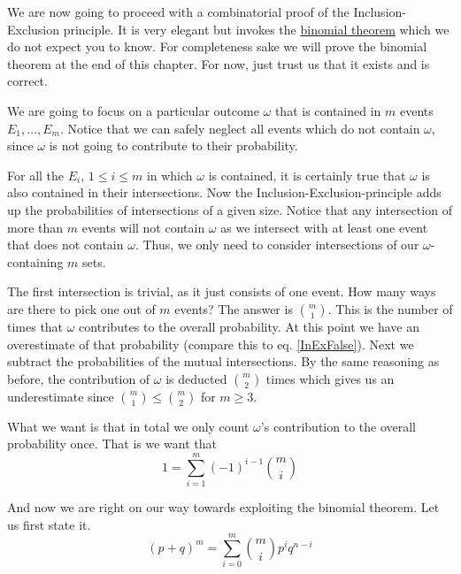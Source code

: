 \documentclass[a4paper,11pt,leqno]{report}
\begin{document}
We are now going to proceed with a combinatorial proof of the Inclusion-Exclusion principle. It is
very elegant but invokes the \href{https://en.wikipedia.org/wiki/Binomial_theorem}{binomial theorem}
which we do not expect you to know. For completeness sake we will prove the binomial theorem
at the end of this chapter. For now, just trust us that it exists and is correct.

We are going to focus on a particular outcome $ \omega $ that is contained in $ m $ events 
$ E_{1}, \ldots, E_{m} $. Notice that we can safely neglect all events which do not contain
$ \omega $, since $ \omega $ is not going to contribute to their probability. 

For all the $ E_{i} $, $ 1 \leq i \leq m $ in which $ \omega $ is contained, it is certainly true
that $ \omega $ is also contained in their intersections. Now the Inclusion-Exclusion-principle
adds up the probabilities of intersections of a given size. Notice that any intersection of more
than $ m $ events will not contain $ \omega $ as we intersect with at least one event that does not
contain $ \omega $. Thus, we only need to consider intersections of our $ \omega $-containing $ m $
sets.

The first intersection is trivial, as it just consists of one event. How many ways are there to pick
one out of $ m $ events? The answer is $ \binom{m}{1} $. This is the number of times that $ \omega $
contributes to the overall probability. At this point we have an overestimate of that probability 
(compare this to eq. \ref{InExFalse}). Next we subtract the probabilities of the mutual intersections.
By the same reasoning as before, the contribution of $ \omega $ is deducted $ \binom{m}{2} $ times
which gives us an underestimate since $ \binom{m}{1} \leq \binom{m}{2} $ for $ m \geq 3 $.

What we want is that in total we only count $ \omega $'s contribution to the overall probability once.
That is we want that
\begin{equation} \label{InExProofStep1}
1 = \underset{i=1}{\overset{m}{\sum}}(-1)^{i-1}\binom{m}{i}
\end{equation}

And now we are right on our way towards exploiting the binomial theorem. Let us first state it.
\begin{equation} \label{binomTheorem}
(p + q)^{m} = \underset{i=0}{\overset{m}{\sum}} \binom{m}{i} p^{i}q^{n-i} 
\end{equation}
\end{document}
